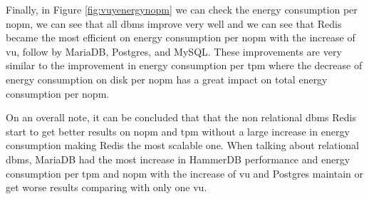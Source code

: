     
    Finally, in Figure \ref{fig:vuyenergynopm} we can check the energy consumption per \gls{nopm}, we can see that all \gls{dbms} improve very well and we can see that Redis became the most efficient on energy consumption per 
\gls{nopm} with the increase of \gls{vu}, follow by MariaDB, Postgres, and MySQL. These improvements are very similar to the improvement in energy consumption per \gls{tpm} where the decrease of energy consumption on disk per \gls{nopm} has a great impact on total energy consumption per \gls{nopm}.
    


  On an overall note, it can be concluded that that the non relational \gls{dbms} Redis start to get better results on  \gls{nopm} and \gls{tpm} without a large increase in energy consumption making Redis the most scalable one. When talking about relational \gls{dbms}, MariaDB had the most increase in HammerDB performance and energy consumption per \gls{tpm} and \gls{nopm} with the increase of \gls{vu} and Postgres maintain or get worse results comparing with only one \gls{vu}.
